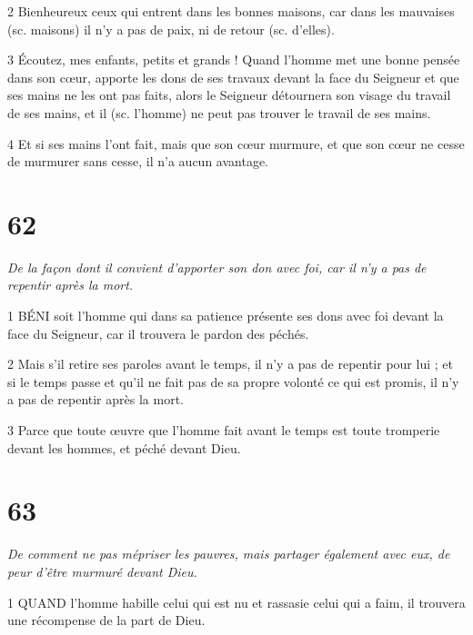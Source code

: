 \par 2 Bienheureux ceux qui entrent dans les bonnes maisons, car dans les mauvaises (sc. maisons) il n'y a pas de paix, ni de retour (sc. d'elles).

\par 3 Écoutez, mes enfants, petits et grands ! Quand l'homme met une bonne pensée dans son cœur, apporte les dons de ses travaux devant la face du Seigneur et que ses mains ne les ont pas faits, alors le Seigneur détournera son visage du travail de ses mains, et il (sc. l'homme) ne peut pas trouver le travail de ses mains.

\par 4 Et si ses mains l'ont fait, mais que son cœur murmure, et que son cœur ne cesse de murmurer sans cesse, il n'a aucun avantage.

\chapter{62}

\par \textit{De la façon dont il convient d'apporter son don avec foi, car il n'y a pas de repentir après la mort.}

\par 1 BÉNI soit l'homme qui dans sa patience présente ses dons avec foi devant la face du Seigneur, car il trouvera le pardon des péchés.

\par 2 Mais s'il retire ses paroles avant le temps, il n'y a pas de repentir pour lui ; et si le temps passe et qu'il ne fait pas de sa propre volonté ce qui est promis, il n'y a pas de repentir après la mort.

\par 3 Parce que toute œuvre que l'homme fait avant le temps est toute tromperie devant les hommes, et péché devant Dieu.



\chapter{63}

\par \textit{De comment ne pas mépriser les pauvres, mais partager également avec eux, de peur d'être murmuré devant Dieu.}

\par 1 QUAND l'homme habille celui qui est nu et rassasie celui qui a faim, il trouvera une récompense de la part de Dieu.

